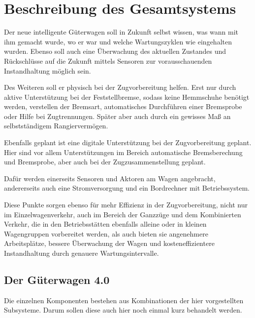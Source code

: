 \section{Beschreibung des Gesamtsystems}
Der neue intelligente Güterwagen soll in Zukunft selbst wissen, was wann mit ihm gemacht wurde, wo er war und welche Wartungszyklen wie eingehalten wurden. Ebenso soll auch eine Überwachung des aktuellen Zustandes und Rückschlüsse auf die Zukunft mittels Sensoren zur vorausschauenden Instandhaltung möglich sein.\par
Des Weiteren  soll er physisch bei der Zugvorbereitung helfen. Erst nur durch aktive Unterstützung bei der Feststellbremse, sodass keine Hemmschuhe benötigt werden, verstellen der \gls{Bremsart}, automatisches Durchführen einer Bremsprobe oder Hilfe bei Zugtrennungen. Später aber auch durch ein gewisses Maß an selbstständigem Rangiervermögen.\par
Ebenfalls geplant ist eine digitale Unterstützung bei der Zugvorbereitung geplant. Hier sind vor allem Unterstützungen im Bereich automatische Bremsberechung und Bremsprobe, aber auch bei der Zugzusammenstellung geplant.\par
Dafür werden einerseits Sensoren und Aktoren am Wagen angebracht, andererseits auch eine Stromversorgung und ein Bordrechner mit Betriebssystem.\par
Diese Punkte sorgen ebenso für mehr Effizienz in der Zugvorbereitung, nicht nur im Einzelwagenverkehr, auch im Bereich der Ganzzüge und dem Kombinierten Verkehr, die in den Betriebsstätten ebenfalls alleine oder in kleinen Wagengruppen vorbereitet werden, als auch bieten sie angenehmere Arbeitsplätze, bessere Überwachung der Wagen und kosteneffizientere Instandhaltung durch genauere Wartungsintervalle.\par

\subsection{Der Güterwagen 4.0}
Die einzelnen Komponenten bestehen aus Kombinationen der hier vorgestellten Subsysteme. Darum sollen diese auch hier noch einmal kurz behandelt werden.


